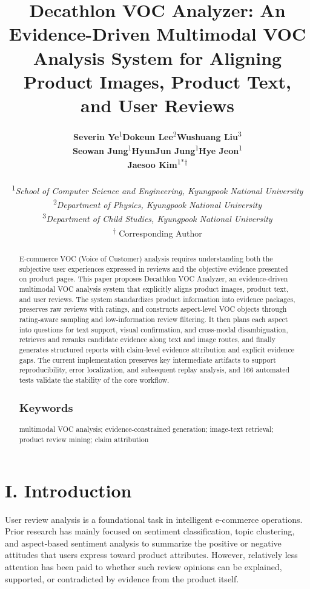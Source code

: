 \documentclass[11pt]{article}
\title{\textbf{Decathlon VOC Analyzer: An Evidence-Driven Multimodal VOC Analysis System for Aligning Product Images, Product Text, and User Reviews}}
\author{{\small
\begin{tabular}{@{}ccc@{}}
\parbox[t]{0.3067\textwidth}{\centering \textbf{Severin Ye}\textsuperscript{1}} & \parbox[t]{0.3067\textwidth}{\centering \textbf{Dokeun Lee}\textsuperscript{2}} & \parbox[t]{0.3067\textwidth}{\centering \textbf{Wushuang Liu}\textsuperscript{3}} \\[0.9em]
\parbox[t]{0.3067\textwidth}{\centering \textbf{Seowan Jung}\textsuperscript{1}} & \parbox[t]{0.3067\textwidth}{\centering \textbf{HyunJun Jung}\textsuperscript{1}} & \parbox[t]{0.3067\textwidth}{\centering \textbf{Hye Jeon}\textsuperscript{1}} \\[0.9em]
\parbox[t]{0.3067\textwidth}{} & \parbox[t]{0.3067\textwidth}{\centering \textbf{Jaesoo Kim}\textsuperscript{1*†}} & \parbox[t]{0.3067\textwidth}{} \\
\multicolumn{3}{c}{} \\[0.45em]
\multicolumn{3}{c}{\parbox{0.9200\textwidth}{\centering\small\textsuperscript{1}\textit{School of Computer Science and Engineering, Kyungpook National University}}} \\
\multicolumn{3}{c}{\parbox{0.9200\textwidth}{\centering\small\textsuperscript{2}\textit{Department of Physics, Kyungpook National University}}} \\
\multicolumn{3}{c}{\parbox{0.9200\textwidth}{\centering\small\textsuperscript{3}\textit{Department of Child Studies, Kyungpook National University}}} \\
\multicolumn{3}{c}{\small \textsuperscript{†}  Corresponding Author} \\
\end{tabular}
}}
\date{} %
\begin{document}
\maketitle
\nocite{lewis2020retrievalAugmentedGeneration,gao2023rarr,radford2021clip,liu2024structuredOutputBenchmark,geng2023grammarConstrainedDecoding,yao2023react,nvidia2024multimodalRagIntro,nvidia2024aiReadyKnowledgeSystems,faysse2024colpali,pontiki2014semevalAspect,qdrant2024pdfRetrievalAtScale,qdrant2024multiVectorCourse,manning2008introductionIr}

\begin{abstract}
E-commerce VOC (Voice of Customer) analysis requires understanding both the subjective user experiences expressed in reviews and the objective evidence presented on product pages. This paper proposes Decathlon VOC Analyzer, an evidence-driven multimodal VOC analysis system that explicitly aligns product images, product text, and user reviews. The system standardizes product information into evidence packages, preserves raw reviews with ratings, and constructs aspect-level VOC objects through rating-aware sampling and low-information review filtering. It then plans each aspect into questions for text support, visual confirmation, and cross-modal disambiguation, retrieves and reranks candidate evidence along text and image routes, and finally generates structured reports with claim-level evidence attribution and explicit evidence gaps. The current implementation preserves key intermediate artifacts to support reproducibility, error localization, and subsequent replay analysis, and 166 automated tests validate the stability of the core workflow.

\subsection{Keywords}

multimodal VOC analysis; evidence-constrained generation; image-text retrieval; product review mining; claim attribution
\end{abstract}

\section{I. Introduction}
User review analysis is a foundational task in intelligent e-commerce operations. Prior research has mainly focused on sentiment classification, topic clustering, and aspect-based sentiment analysis to summarize the positive or negative attitudes that users express toward product attributes. However, relatively less attention has been paid to whether such review opinions can be explained, supported, or contradicted by evidence from the product itself.
\end{document}
